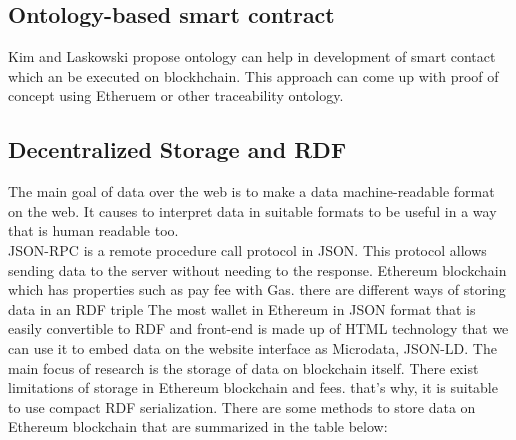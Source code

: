 \subsection{Ontology-based smart contract}
Kim and Laskowski\cite{Kim} propose ontology can help in development of smart contact which an be executed on blockhchain. This approach can come up with proof of concept using Etheruem or other traceability ontology\cite{Hector}.

\subsection{Decentralized Storage and RDF}
The main goal of data over the web is to make a data machine-readable format on the web. It causes to interpret data in suitable formats to be useful in a way that is human readable too. \\
JSON-RPC is a remote procedure call protocol in JSON. This protocol allows sending data to the server without needing to the response. 
Ethereum blockchain which has properties such as pay 
fee with Gas. there are different ways of storing data in an RDF triple
The most wallet in Ethereum in JSON format that is easily convertible to RDF and front-end is made up of HTML  technology that we can use it to embed data on the website interface as Microdata, JSON-LD. The main focus of research is the storage of data on blockchain itself. There exist limitations of storage in Ethereum blockchain and fees. that's why, it is suitable to use compact RDF serialization. There are some methods to store data on Ethereum  blockchain that are summarized in the table below\cite{
Hector}:\\

